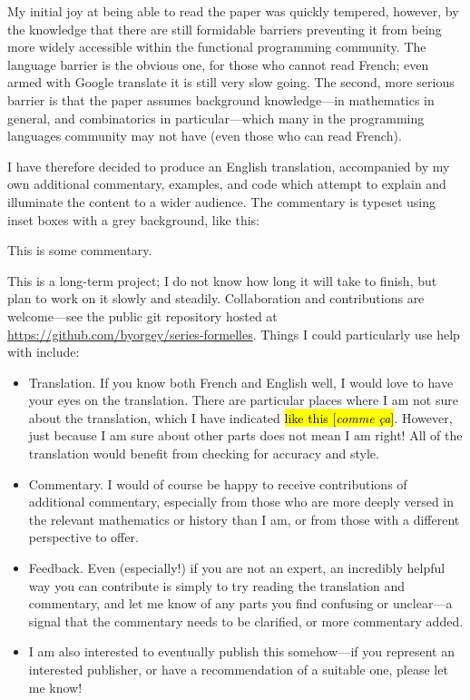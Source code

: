 \documentclass{amsart}
\theoremstyle{definition}
\theoremstyle{remark}
\newcommand{\trans}[2]{\hl{#1 [\textit{#2}]}}
\begin{document}
My initial joy at being able to read the paper was quickly tempered,
however, by the knowledge that there are still formidable barriers
preventing it from being more widely accessible within the functional
programming community. The language barrier is the obvious one, for
those who cannot read French; even armed with Google translate it is
still very slow going.  The second, more serious barrier is that the
paper assumes background knowledge---in mathematics in general, and
combinatorics in particular---which many in the programming languages
community may not have (even those who can read French).

I have therefore decided to produce an English translation,
accompanied by my own additional commentary, examples, and code which
attempt to explain and illuminate the content to a wider audience.
The commentary is typeset using inset boxes with a grey background,
like this:
\begin{commentary}
  This is some commentary.
\end{commentary}

This is a long-term project; I do not know how long it will take to
finish, but plan to work on it slowly and steadily.  Collaboration and
contributions are welcome---see the public git repository hosted at
\url{https://github.com/byorgey/series-formelles}. Things I could
particularly use help with include:
\begin{itemize}
\item Translation.  If you know both French and English well, I would
  love to have your eyes on the translation.  There are particular
  places where I am not sure about the translation, which I have
  indicated \trans{like this}{comme \c{c}a}.  However, just because I
  am sure about other parts does not mean I am right! All of the
  translation would benefit from checking for accuracy and style.
\item Commentary. I would of course be happy to receive contributions
  of additional commentary, especially from those who are more deeply
  versed in the relevant mathematics or history than I am, or from
  those with a different perspective to offer.
\item Feedback. Even (especially!) if you are not an expert, an
  incredibly helpful way you can contribute is simply to try reading
  the translation and commentary, and let me know of any parts you
  find confusing or unclear---a signal that the commentary needs to be
  clarified, or more commentary added.
\item I am also interested to eventually publish this somehow---if you
  represent an interested publisher, or have a recommendation of a
  suitable one, please let me know!
\end{itemize}
\end{document}
